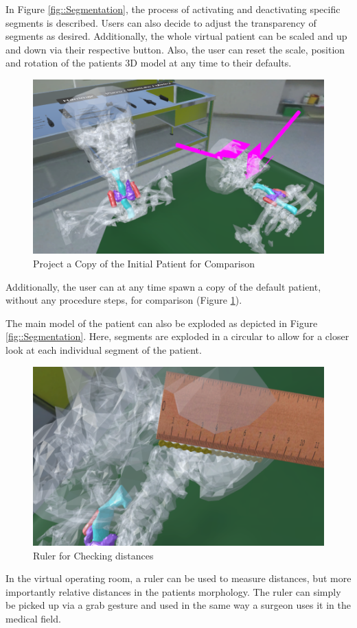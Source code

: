 In Figure \ref{fig::Segmentation}, the process of activating and deactivating specific segments is described.
Users can also decide to adjust the transparency of segments as desired.
Additionally, the whole virtual patient can be scaled and up and down via their respective button.
Also, the user can reset the scale, position and rotation of the patients 3D model at any time to their defaults.

\begin{figure}[ht!]
  \centering
  \includegraphics[width=\linewidth]{images/implementation/features/visualization/project_copy.png}
  \caption{\label{fig::ProjectCopy} Project a Copy of the Initial Patient for Comparison}
\end{figure}

Additionally, the user can at any time spawn a copy of the default patient, without any procedure steps, for comparison (Figure \ref{fig::ProjectCopy}).

The main model of the patient can also be exploded as depicted in Figure \ref{fig::Segmentation}.
Here, segments are exploded in a circular to allow for a closer look at each individual segment of the patient.

\begin{figure}[ht!]
    \centering
    \includegraphics[width=\linewidth]{images/implementation/features/visualization/ruler.png}
    \caption{\label{fig::FeatureRuler} Ruler for Checking distances}
\end{figure}

In the virtual operating room, a ruler can be used to measure distances, but more importantly relative distances in the patients morphology.
The ruler can simply be picked up via a grab gesture and used in the same way a surgeon uses it in the medical field.
